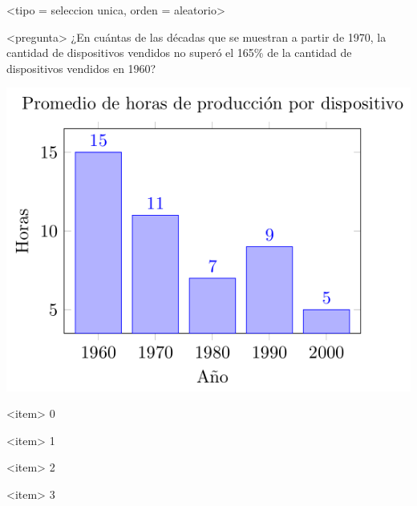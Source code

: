 <tipo = seleccion unica, orden = aleatorio>

<pregunta>
¿En cuántas de las décadas que se muestran a partir de 1970, la cantidad de dispositivos vendidos no superó el 165\% de la cantidad de dispositivos vendidos en 1960?
\begin{center}
  \includegraphics[scale=0.5]{../promedio.png}
\end{center}

<item>
0

<item>
1

<item>
2

<item>
3

